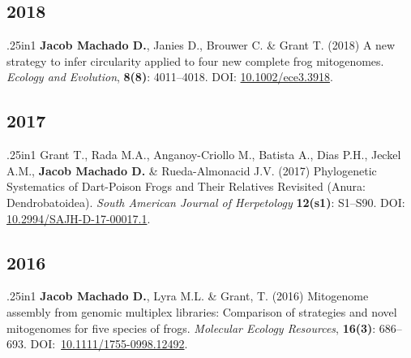 \documentclass[11pt, letterpaper, sans]{moderncv}
\begin{document}

\subsection{2018}

    {\setlength{\parskip}{.5em}\renewcommand{\baselinestretch}{2.0}\begin{hangparas}{.25in}{1}
		\textbf{Jacob Machado D.}, Janies D., Brouwer C. \& Grant T. (2018) A new strategy to infer circularity applied to four new complete frog mitogenomes. \emph{Ecology and Evolution}, \textbf{8(8)}: 4011--4018. DOI: \href{http://doi.wiley.com/10.1002/ece3.3918}{10.1002/ece3.3918}.
	\end{hangparas}}


\subsection{2017}

    {\setlength{\parskip}{.5em}\renewcommand{\baselinestretch}{2.0}\begin{hangparas}{.25in}{1}
		Grant T., Rada M.A., Anganoy-Criollo M., Batista A., Dias P.H., Jeckel A.M., \textbf{Jacob Machado D.} \& Rueda-Almonacid J.V. (2017) Phylogenetic Systematics of Dart-Poison Frogs and Their Relatives Revisited (Anura: Dendrobatoidea). \emph{South American Journal of Herpetology} \textbf{12(s1)}: S1--S90. DOI: \href{http://www.bioone.org/doi/10.2994/SAJH-D-17-00017.1}{10.2994/SAJH-D-17-00017.1}.
	\end{hangparas}}


\subsection{2016}

    {\setlength{\parskip}{.5em}\renewcommand{\baselinestretch}{2.0}\begin{hangparas}{.25in}{1}
		\textbf{Jacob Machado D.}, Lyra M.L. \& Grant, T. (2016) Mitogenome assembly from genomic multiplex libraries: Comparison of strategies and novel mitogenomes for five species of frogs. \emph{Molecular Ecology Resources}, \textbf{16(3)}: 686--693. DOI:~\href{https://doi.org/10.1111/1755-0998.12492}{10.1111/1755-0998.12492}.
	\end{hangparas}}

\end{document}
